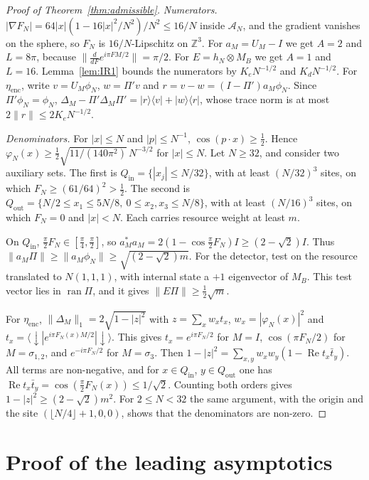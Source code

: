 \documentclass[11pt]{amsart}
\theoremstyle{definition}
\theoremstyle{remark}
\newcommand{\Z}{\mathbb{Z}}
\newcommand{\cA}{\mathcal{A}}
\newcommand{\dn}{{\downarrow}}
\newcommand{\re}{\operatorname{Re}}
\begin{document}
\begin{proof}[Proof of Theorem~\ref{thm:admissible}]
\emph{Numerators.}  $|\nabla F_N|=64|x|(1-16|x|^2/N^2)/N^2\le16/N$ inside
$\cA_N$, and the gradient vanishes on the sphere, so $F_N$ is
$16/N$-Lipschitz on $\Z^3$.  For $a_M=U_M-I$ we get $A=2$ and $L=8\pi$,
because $\|\frac{d}{dF}e^{i\pi FM/2}\|=\pi/2$.  For $E=h_N\otimes M_B$ we get
$A=1$ and $L=16$.  Lemma~\ref{lem:IR1} bounds the numerators by
$K_eN^{-1/2}$ and $K_dN^{-1/2}$.  For $\eta_{\mathrm{enc}}$, write
$v=U_M\phi_N$, $w=\Pi'v$ and $r=v-w=(I-\Pi')a_M\phi_N$.  Since
$\Pi'\phi_N=\phi_N$, $\Delta_M-\Pi'\Delta_M\Pi'=|r\rangle\langle v|+|w\rangle\langle r|$,
whose trace norm is at most $2\|r\|\le2K_eN^{-1/2}$.

\emph{Denominators.}  For $|x|\le N$ and $|p|\le N^{-1}$, $\cos(p\cdot x)\ge\frac12$.
Hence $\varphi_N(x)\ge\frac12\sqrt{11/(140\pi^2)}\,N^{-3/2}$ for $|x|\le N$.
Let $N\ge32$, and consider two auxiliary sets.  The first is
$Q_{\mathrm{in}}=\{|x_j|\le N/32\}$, with at least $(N/32)^3$ sites, on which
$F_N\ge(61/64)^2>\frac12$.  The second is
$Q_{\mathrm{out}}=\{N/2\le x_1\le5N/8,\ 0\le x_2,x_3\le N/8\}$, with at least
$(N/16)^3$ sites, on which $F_N=0$ and $|x|<N$.  Each carries resource
weight at least $m$.

On $Q_{\mathrm{in}}$, $\frac\pi2F_N\in[\frac\pi4,\frac\pi2]$, so
$a_M^*a_M=2(1-\cos\frac\pi2F_N)I\ge(2-\sqrt2)I$.  Thus
$\|a_M\Pi\|\ge\|a_M\phi_N\|\ge\sqrt{(2-\sqrt2)m}$.  For the detector, test
on the resource translated to $N(1,1,1)$, with internal state a
$+1$ eigenvector of $M_B$.  This test vector lies in $\operatorname{ran}\Pi$,
and it gives $\|E\Pi\|\ge\frac12\sqrt m$.

For $\eta_{\mathrm{enc}}$, $\|\Delta_M\|_1=2\sqrt{1-|z|^2}$ with
$z=\sum_xw_xt_x$, $w_x=|\varphi_N(x)|^2$ and
$t_x=\langle\dn|e^{i\pi F_N(x)M/2}|\dn\rangle$.  This gives $t_x=e^{i\pi F_N/2}$
for $M=I$, $\cos(\pi F_N/2)$ for $M=\sigma_{1,2}$, and $e^{-i\pi F_N/2}$ for
$M=\sigma_3$.  Then
$1-|z|^2=\sum_{x,y}w_xw_y(1-\re t_x\bar t_y)$.  All terms are non-negative,
and for $x\in Q_{\mathrm{in}}$, $y\in Q_{\mathrm{out}}$ one has
$\re t_x\bar t_y=\cos(\frac\pi2F_N(x))\le1/\sqrt2$.  Counting both orders
gives $1-|z|^2\ge(2-\sqrt2)m^2$.  For $2\le N<32$ the same argument, with
the origin and the site $(\lfloor N/4\rfloor+1,0,0)$, shows that the
denominators are non-zero.
\end{proof}

\section{Proof of the leading asymptotics}\label{sec:asymptotics}
\end{document}
